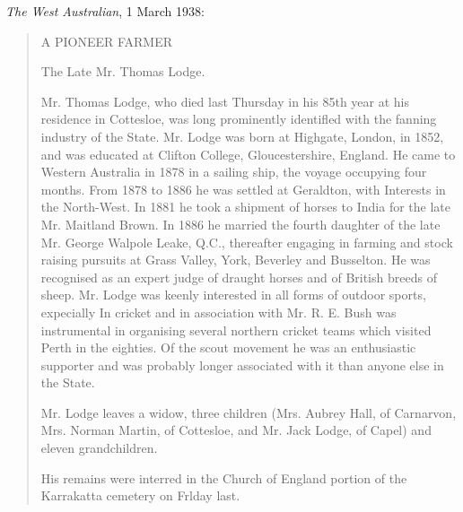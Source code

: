 
\emph{The West Australian}, 1 March 1938:\cite{PioneerFarmer1938}

\begin{quotation}
A PIONEER FARMER

The Late Mr. Thomas Lodge.

Mr. Thomas Lodge, who died last Thursday in his 85th year at his residence in Cottesloe,
was long prominently identifled with the fanning industry of the State.
Mr. Lodge was born at Highgate, London, in 1852, and was educated at Clifton College, Gloucestershire, England.
He came to Western Australia in 1878 in a sailing ship, the voyage occupying four months.
From 1878 to 1886 he was settled at Geraldton, with Interests in the North-West.
In 1881 he took a shipment of horses to India for the late Mr. Maitland Brown.
In 1886 he married the fourth daughter of the late Mr. George Walpole Leake, Q.C., thereafter engaging
in farming and stock raising pursuits at Grass Valley, York, Beverley and Busselton.
He was recognised as an expert judge of draught horses and of British breeds of sheep.
Mr. Lodge was keenly interested in all forms of outdoor sports, expecially In cricket and in association
with Mr. R. E. Bush was instrumental in organising several northern cricket teams which visited Perth in the eighties.
Of the scout movement he was an enthusiastic supporter and was probably longer associated with it than anyone else in the State.

Mr. Lodge leaves a widow, three children (Mrs. Aubrey Hall, of Carnarvon,
Mrs. Norman Martin, of Cottesloe, and Mr. Jack Lodge, of Capel) and eleven grandchildren.

His remains were interred in the Church of England portion of the Karrakatta cemetery on Frlday last.
\end{quotation}
